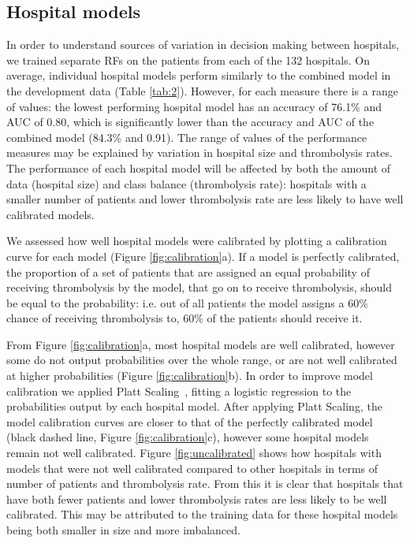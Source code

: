\documentclass[12pt,a4paper, pdftex]{elsarticle}
\begin{document}
\subsection{Hospital models}

In order to understand sources of variation in decision making between hospitals, we trained separate RFs on the patients from each of the 132 hospitals. On average, individual hospital models perform similarly to the combined model in the development data (Table \ref{tab:2}). However, for each measure there is a range of values: the lowest performing hospital model has an accuracy of 76.1\% and AUC of 0.80, which is significantly lower than the accuracy and AUC of the combined model (84.3\% and 0.91). The range of values of the performance measures may be explained by variation in hospital size and thrombolysis rates. The performance of each hospital model will be affected by both the amount of data (hospital size) and class balance (thrombolysis rate): hospitals with a smaller number of patients and lower thrombolysis rate are less likely to have well calibrated models.

We assessed how well hospital models were calibrated by plotting a calibration curve for each model (Figure \ref{fig:calibration}a). If a model is perfectly calibrated, the proportion of a set of patients that are assigned an equal probability of receiving thrombolysis by the model, that go on to receive thrombolysis, should be equal to the probability: i.e. out of all patients the model assigns a 60\% chance of receiving thrombolysis to, 60\% of the patients should receive it. 


From Figure \ref{fig:calibration}a, most hospital models are well calibrated, however some do not output probabilities over the whole range, or are not well calibrated at higher probabilities (Figure \ref{fig:calibration}b). In order to improve model calibration we applied Platt Scaling~\cite{platt1999probabilistic}, fitting a logistic regression to the probabilities output by each hospital model. After applying Platt Scaling, the model calibration curves are closer to that of the perfectly calibrated model (black dashed line, Figure \ref{fig:calibration}c), however some hospital models remain not well calibrated. Figure \ref{fig:uncalibrated} shows how hospitals with models that were not well calibrated compared to other hospitals in terms of number of patients and thrombolysis rate. From this it is clear that hospitals that have both fewer patients and lower thrombolysis rates are less likely to be well calibrated. This may be attributed to the training data for these hospital models being both smaller in size and more imbalanced.
\end{document}
